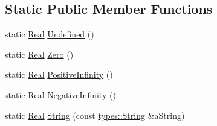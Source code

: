 \subsection*{Static Public Member Functions}
\begin{DoxyCompactItemize}
\item 
static \hyperlink{classlibrary_1_1core_1_1types_1_1Real}{Real} \hyperlink{classlibrary_1_1core_1_1types_1_1Real_a67778e3d4c5a5b6ca6ddcd47964b9a79}{Undefined} ()
\item 
static \hyperlink{classlibrary_1_1core_1_1types_1_1Real}{Real} \hyperlink{classlibrary_1_1core_1_1types_1_1Real_a35434e6329366cb571efbd9c4ead6501}{Zero} ()
\item 
static \hyperlink{classlibrary_1_1core_1_1types_1_1Real}{Real} \hyperlink{classlibrary_1_1core_1_1types_1_1Real_a7f4aa42fec951281e976eebca95e695e}{Positive\+Infinity} ()
\item 
static \hyperlink{classlibrary_1_1core_1_1types_1_1Real}{Real} \hyperlink{classlibrary_1_1core_1_1types_1_1Real_a04f125b4861a4f348b9754fc65fbbb43}{Negative\+Infinity} ()
\item 
static \hyperlink{classlibrary_1_1core_1_1types_1_1Real}{Real} \hyperlink{classlibrary_1_1core_1_1types_1_1Real_ac0209eca829dcdc3b1be96f834763d8e}{String} (const \hyperlink{classlibrary_1_1core_1_1types_1_1String}{types\+::\+String} \&a\+String)
\end{DoxyCompactItemize}
